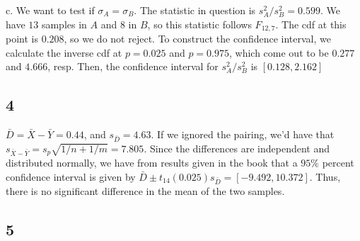 \documentclass{article}
\begin{document}
\noindent c. We want to test if $\sigma_A=\sigma_B$. The statistic in question is $s_A^2/s_B^2=0.599$. We have $13$ samples in $A$ and $8$ in $B$, so this statistic follows $F_{12,7}$. The cdf at this point is $0.208$, so we do not reject. To construct the confidence interval, we calculate the inverse cdf at $p=0.025$ and $p=0.975$, which come out to be $0.277$ and $4.666$, resp. Then, the confidence interval for $s_A^2/s_B^2$ is $[0.128,2.162]$
\subsection*{4}
$\bar{D}=\bar{X}-\bar{Y}=0.44$, and $s_{\bar{D}}=4.63$. If we ignored the pairing, we'd have that $s_{\bar{X}-\bar{Y}}=s_p\sqrt{1/n+1/m}=7.805$. Since the differences are independent and distributed normally, we have from results given in the book that a $95\%$ percent confidence interval is given by $\bar{D}\pm t_{14}(0.025)s_\bar{D}=[-9.492,10.372]$. Thus, there is no significant difference in the mean of the two samples. 
\subsection*{5}
\end{document}
